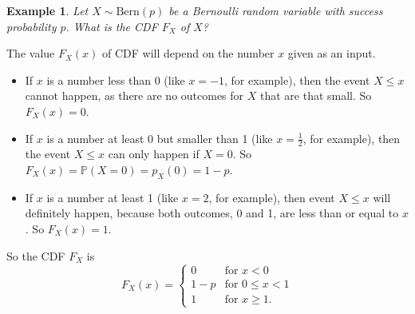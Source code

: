 \documentclass[
  a4paper,
]{book}
\theoremstyle{definition}
\theoremstyle{definition}
\newtheorem{example}{Example}[chapter]
\theoremstyle{definition}
\theoremstyle{definition}
\theoremstyle{remark}
\begin{document}
\begin{example}
\emph{Let \(X \sim \text{Bern}(p)\) be a Bernoulli random variable with success probability \(p\). What is the CDF \(F_X\) of \(X\)?}

The value \(F_X(x)\) of CDF will depend on the number \(x\) given as an input.

\begin{itemize}
\item
  If \(x\) is a number less than 0 (like \(x = -1\), for example), then the event \(X \leq x\) cannot happen, as there are no outcomes for \(X\) that are that small. So \(F_X(x) = 0\).
\item
  If \(x\) is a number at least 0 but smaller than 1 (like \(x = \frac12\), for example), then the event \(X \leq x\) can only happen if \(X = 0\). So \(F_X(x) = \mathbb P(X = 0) = p_X(0) = 1 - p\).
\item
  If \(x\) is a number at least 1 (like \(x = 2\), for example), then event \(X \leq x\) will definitely happen, because both outcomes, 0 and 1, are less than or equal to \(x\). So \(F_X(x) = 1\).
\end{itemize}

So the CDF \(F_X\) is
\[ F_X(x) = \begin{cases} 0 & \text{for $x < 0$} \\
                      1-p & \text{for $0 \leq x < 1$} \\
                      1   & \text{for $x \geq 1$} . \end{cases} \]
\end{example}
\end{document}
